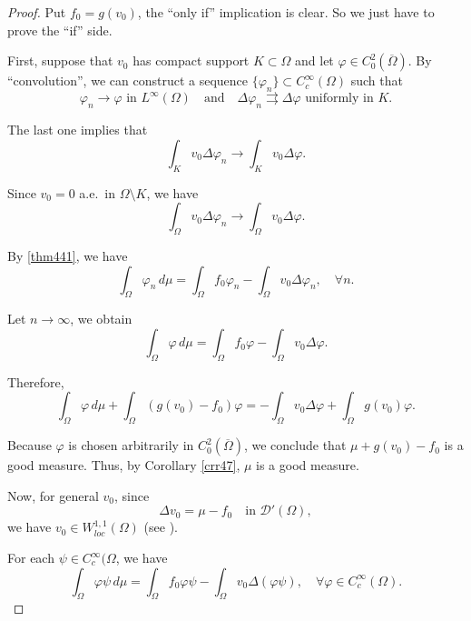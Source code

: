 \documentclass[a4paper, 11pt]{report}
\theoremstyle{definition}\newtheorem*{rmk}{Remark}
\begin{document}
\begin{proof}
Put $f_0 = g(v_0)$, the ``only if'' implication is clear. So we just have to prove the ``if'' side.

First, suppose that $v_0$ has compact support $K \subset \Omega$ and let $\varphi \in C^2_0(\overline{\Omega})$. By ``convolution'', we can construct a sequence $\{\varphi_n\}\subset C_c^{\infty}(\Omega)$ such that
\begin{equation}\label{thm4524}
\varphi_n \to \varphi \text{ in }L^{\infty}(\Omega) \quad\text{and}\quad \Delta\varphi_n \rightrightarrows \Delta\varphi \text{ uniformly in }K.
\end{equation}

The last one implies that
\[
\int_K v_0 \Delta \varphi_n \to \int_K v_0 \Delta \varphi.
\]

Since $v_0 = 0$ a.e.\ in $\Omega\setminus K$, we have
\[
\int_{\Omega} v_0 \Delta \varphi_n \to \int_{\Omega} v_0 \Delta \varphi.
\]

By \eqref{thm441}, we have
\[
\int_{\Omega} \varphi_n \,d\mu = \int_{\Omega}f_0\varphi_n - \int_{\Omega}v_0\Delta \varphi_n,\quad\forall n.
\]

Let $n \to \infty$, we obtain
\[
\int_{\Omega} \varphi \,d\mu = \int_{\Omega}f_0\varphi - \int_{\Omega}v_0\Delta \varphi .
\]

Therefore,
\[
\int_{\Omega} \varphi \,d\mu + \int_{\Omega}(g(v_0)-f_0)\varphi = -\int_{\Omega}v_0\Delta \varphi + \int_{\Omega}g(v_0)\varphi.
\]

Because $\varphi$ is chosen arbitrarily in $C_0^2(\overline{\Omega})$, we conclude that $\mu + g(v_0) - f_0$ is a good measure. Thus, by Corollary \ref{crr47}, $\mu$ is a good measure.

Now, for general $v_0$, since
\[
\Delta v_0 = \mu - f_0 \quad\text{in }\mathcal{D}'(\Omega),
\]
we have $v_0 \in W^{1,1}_{loc}(\Omega)$ (see \cite[Lemma 5.3]{P}).

For each $\psi \in C_c^{\infty}(\Omega$, we have
\[
\int_{\Omega}\varphi \psi\,d\mu = \int_{\Omega}f_0 \varphi \psi - \int_{\Omega}v_0 \Delta(\varphi \psi), \quad\forall\varphi \in C_c^{\infty}(\Omega).
\]


\end{proof}
\end{document}
